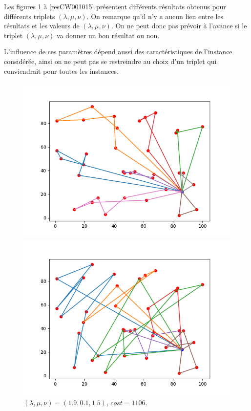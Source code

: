 \documentclass[a4paper,11pt]{article}%
\begin{document}
Les figures \ref{resCW190105} à \ref{resCW001015} présentent différents résultats obtenus pour différents triplets $(\lambda, \mu, \nu)$.
On remarque qu'il n'y a aucun lien entre les résultats et les valeurs de $(\lambda, \mu, \nu)$. 
On ne peut donc pas prévoir à l'avance si le triplet $(\lambda, \mu, \nu)$ va donner un bon résultat ou non.

L'influence de ces paramètres dépend aussi des caractéristiques de l'instance considérée, ainsi on ne peut pas se restreindre au choix d'un triplet qui conviendrait pour toutes les instances. 

\begin{figure}
    \begin{minipage}[c]{.42\linewidth}
        \centering
	\includegraphics[scale=0.4]{resCW190105.png}
 
 	\caption{$(\lambda, \mu, \nu)=(1.9,0.1,1.5)$, $ cost = 1106$.}
 	\label{resCW190105}
    \end{minipage}
	\hfill%
    \begin{minipage}[c]{.42\linewidth}
        \centering
	\includegraphics[scale=0.4]{resCW111.png}
	

\end{minipage}
\end{figure}
\end{document}
